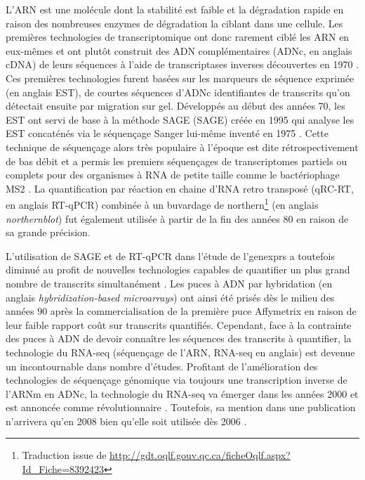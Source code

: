 L'\acrshort{ARN} est une molécule dont la stabilité est faible et la dégradation rapide en raison des nombreuses enzymes de dégradation la ciblant dans une cellule. Les premières technologies de \gls{transcriptomique} ont donc rarement ciblé les ARN en eux-mêmes et ont plutôt construit des \acrshort{ADN} complémentaires (\acrshort{ADNc}, en anglais cDNA) de leurs séquences à l'aide de transcriptases inverses découvertes en 1970 \cite{Temin1970Jun}. Ces premières technologies furent basées sur les marqueurs de séquence exprimée (en anglais \acrfull{EST}), de courtes séquences d'ADNc identifiantes de transcrits qu'on détectait ensuite par migration sur gel. Développés au début des années 70, les \acrshort{EST} ont servi de base à la méthode \acrshort{SAGE} (\acrlong{SAGE}) créée en 1995 \cite{Velculescu1995Oct} qui analyse les \acrshort{EST} concaténés via le séquençage Sanger lui-même inventé en 1975 \cite{Sanger1975May}. Cette technique de séquençage alors très populaire à l'époque \cite{Marra1998Jan} est dite rétrospectivement de bas débit et a permis les premiers séquençages de \glspl{transcriptome} partiels \cite{Jeppesen1970Apr} ou complets pour des \glspl{organisme} à \acrshort{RNA} de petite taille comme le bactériophage MS2 \cite{Fiers1976Apr}. La quantification par réaction en chaine d'\acrshort{RNA} retro transposé (qRC-RT, en anglais \acrfull{RT-qPCR}) combinée à un buvardage de northern\footnote{Traduction issue de \url{http://gdt.oqlf.gouv.qc.ca/ficheOqlf.aspx?Id_Fiche=8392423}} (en anglais \textit{northernblot}) fut également utilisée à partir de la fin des années 80 en raison de sa grande précision\cite{Becker-Andre1989Nov}.

L'utilisation de \acrshort{SAGE} et de \acrshort{RT-qPCR} dans l'étude de l'\glspl{genexpr} a toutefois diminué au profit de nouvelles technologies capables de quantifier un plus grand nombre de transcrits simultanément \cite{Lowe2017May}. Les puces à \acrshort{ADN} par hybridation (en anglais \textit{hybridization-based microarrays}) ont ainsi été prisés dès le milieu des années 90 \cite{Schena1995Oct} après la commercialisation de la première puce Affymetrix \cite{Lenoir2006} en raison de leur faible rapport coût sur transcrits quantifiés. Cependant, face à la contrainte des puces à \acrshort{ADN} de devoir connaître les séquences des transcrits à quantifier, la technologie du \acrshort{RNA-seq}  (séquençage de l'ARN, \acrshort{RNA-seq} en anglais) est devenue un incontournable dans nombre d'études. 
Profitant de l'amélioration des technologies de séquençage génomique via toujours une transcription inverse de l'ARNm en ADNc, la technologie du \acrshort{RNA-seq} va émerger dans les années 2000 et est annoncée comme révolutionnaire \cite{Wang2009Jan}. Toutefois, sa mention dans une publication n'arrivera qu'en 2008 \cite{Nagalakshmi2008Jun} bien qu'elle soit utilisée dès 2006 \cite{Cheung2006Dec}.

